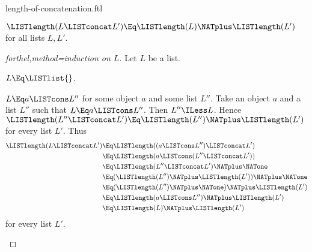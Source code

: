 \documentclass{stex}
\begin{document}
\begin{smodule}{length-of-concatenation.ftl}

\begin{proposition}[forthel]
  $\LISTlength(L \LISTconcat L') \Eq \LISTlength(L) \NATplus \LISTlength(L')$ for all lists $L, L'$.
\end{proposition}
\begin{proof}[forthel,method=induction on $L$]
  Let $L$ be a list.

  \begin{case}{$L \Eq \LISTlist{}$.}\end{case}

  \begin{case}{$L \Eq a \LISTcons L''$ for some object $a$ and some list $L''$.}
    Take an object $a$ and a list $L''$ such that $L \Eq a \LISTcons L''$.
    Then $L'' \ILess L$.
    Hence $\LISTlength(L'' \LISTconcat L') \Eq \LISTlength(L'') \NATplus \LISTlength(L')$ for every list $L'$.
    Thus
    \begin{align*}
      \LISTlength(L \LISTconcat L')
        &\Eq \LISTlength((a \LISTcons L'') \LISTconcat L')\\
        &\Eq \LISTlength(a \LISTcons (L'' \LISTconcat L'))\\
        &\Eq \LISTlength(L'' \LISTconcat L') \NATplus \NATone\\
        &\Eq (\LISTlength(L'') \NATplus \LISTlength(L')) \NATplus \NATone\\
        &\Eq (\LISTlength(L'') \NATplus \NATone) \NATplus \LISTlength(L')\\
        &\Eq \LISTlength(a \LISTcons L'') \NATplus \LISTlength(L')\\
        &\Eq \LISTlength(L) \NATplus \LISTlength(L')
    \end{align*}
    for every list $L'$.
  \end{case}
\end{proof}
\end{smodule}
\end{document}
